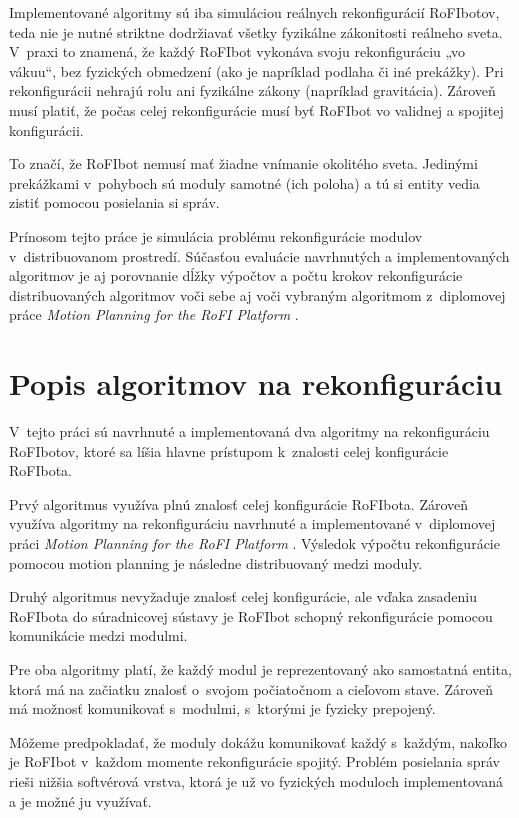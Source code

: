 \documentclass[
  printed, %
  oneside, %
  notable,   %
  nolof,     %
  nolot,     %
]{fithesis3}
\begin{document}
Implementované algoritmy sú iba simuláciou reálnych rekonfigurácií RoFIbotov, teda nie je nutné striktne dodržiavať všetky fyzikálne zákonitosti reálneho sveta. V~praxi to znamená, že každý RoFIbot vykonáva svoju rekonfiguráciu „vo vákuu“, bez fyzických obmedzení (ako je napríklad podlaha či iné prekážky). Pri rekonfigurácii nehrajú rolu ani fyzikálne zákony (napríklad gravitácia). Zároveň musí platiť, že počas celej rekonfigurácie musí byť RoFIbot vo validnej a spojitej konfigurácii. 

To značí, že RoFIbot nemusí mať žiadne vnímanie okolitého sveta. Jedinými prekážkami v~pohyboch sú moduly samotné (ich poloha) a tú si entity vedia zistiť pomocou posielania si správ. 

Prínosom tejto práce je simulácia problému rekonfigurácie modulov v~distribuovanom prostredí. Súčasťou evaluácie navrhnutých a implementovaných algoritmov je aj porovnanie dĺžky výpočtov a počtu krokov rekonfigurácie distribuovaných algoritmov voči sebe aj voči vybraným algoritmom z~diplomovej práce \textit{Motion Planning for the RoFI Platform} \cite{vozarovaMasterThesis}. 

\section{Popis algoritmov na rekonfiguráciu}
\label{sec:algoDesc}
V~tejto práci sú navrhnuté a implementovaná dva algoritmy na rekonfiguráciu RoFIbotov, ktoré sa líšia hlavne prístupom k~znalosti celej konfigurácie RoFIbota. 

Prvý algoritmus využíva plnú znalosť celej konfigurácie RoFIbota. Zároveň využíva algoritmy na rekonfiguráciu navrhnuté a implementované v~diplomovej práci \textit{Motion Planning for the RoFI Platform} \cite{vozarovaMasterThesis}. Výsledok výpočtu rekonfigurácie pomocou motion planning je následne distribuovaný medzi moduly. 

Druhý algoritmus nevyžaduje znalosť celej konfigurácie, ale vďaka zasadeniu RoFIbota do súradnicovej sústavy je RoFIbot schopný rekonfigurácie pomocou komunikácie medzi modulmi. 

Pre oba algoritmy platí, že každý modul je reprezentovaný ako samostatná entita, ktorá má na začiatku znalosť o~svojom počiatočnom a cieľovom stave. Zároveň má možnosť komunikovať s~modulmi, s~ktorými je fyzicky prepojený. 

Môžeme predpokladať, že moduly dokážu komunikovať každý s~každým, nakoľko je RoFIbot v~každom momente rekonfigurácie spojitý. Problém posielania správ rieši nižšia softvérová vrstva, ktorá je už vo fyzických moduloch implementovaná a je možné ju využívať. 
\end{document}
